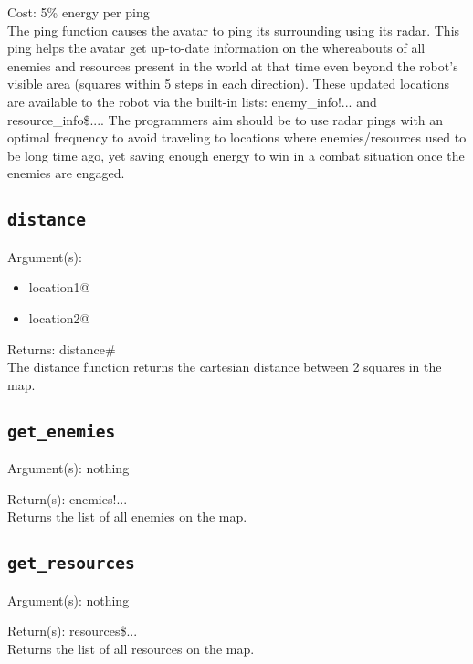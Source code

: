 \documentclass[a4paper]{article}
\begin{document}
\noindent Cost: 5\% energy per ping\\

The ping function causes the avatar to ping its surrounding using its radar.  This ping helps the avatar get up-to-date information on the whereabouts of all enemies and resources present in the world at that time even beyond the robot's visible area (squares within 5 steps in each direction).  These updated locations are available to the robot via the built-in lists: enemy\_info!... and resource\_info\$....  The programmers aim should be to use radar pings with an optimal frequency to avoid traveling to locations where enemies/resources used to be long time ago, yet saving enough energy to win in a combat situation once the enemies are engaged.

\pagebreak

\subsection{\texttt{distance}}

Argument(s):
\begin{itemize}
	\item location1@
	\item location2@
\end{itemize}

\noindent Returns: distance\#\\

The distance function returns the cartesian distance between 2 squares in the map.

\subsection{\texttt{get\_enemies}}

Argument(s): nothing

\noindent Return(s): enemies!...\\

Returns the list of all enemies on the map.

\subsection{\texttt{get\_resources}}

Argument(s): nothing

\noindent Return(s): resources\$...\\

Returns the list of all resources on the map.
\end{document}
